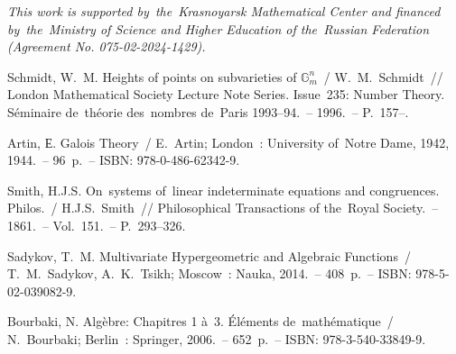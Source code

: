 \documentclass[twoside]{article}
\begin{document}
\medskip

\emph{This work is supported by~the~Krasnoyarsk Mathematical Center and financed
by~the~Ministry of Science and Higher Education of the~Russian Federation (Agreement No. 075-02-2024-1429).}

\bigskip

\begin{thebibliography}{9}

 Schmidt, W.~M. Heights of points on subvarieties of $\mathbb{G}^n_m$~/ W.~M.~{Sch\-midt}~//
London Mathematical Society Lecture Note Series. Issue~235: Number Theory.
S\'eminaire de~th\'eorie des~nombres de~Paris 1993–94.~-- 1996.~-- P.~157--.

 Artin, Е. Galois Theory~/ E.~Artin; London~: University of~Notre Dame, 1942, 1944.~-- 96~p.~-- ISBN: 978-0-486-62342-9.

 Smith, H.J.S. On~systems of~linear indeterminate equations and {con\-gru\-ences}. Philos.~/ H.J.S.~Smith~//
Philosophical Transactions of the~Royal Society.~-- 1861.~-- Vol.~151.~-- P.~293--326.

 Sadykov, T.~M. Multivariate Hypergeometric and Algebraic Functions~/ T.~M.~Sadykov, A.~K.~Tsikh;
Moscow~: Nauka, 2014.~-- 408~p.~-- ISBN: 978-5-02-039082-9.

 Bourbaki, N. Alg\`ebre: Chapitres 1 \`a~3. \'El\'ements de~math\'ematique~/ N.~Bourbaki; Berlin~: Springer, 2006.~-- 652~p.~-- ISBN: 978-3-540-33849-9.

\end{thebibliography}

\makeRusTit   %
\end{document}

